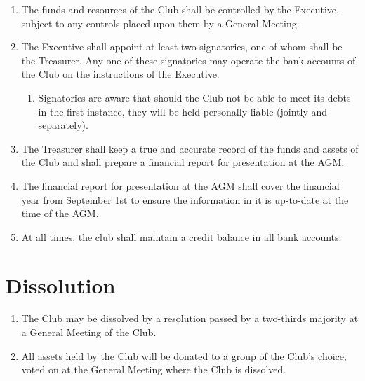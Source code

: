 \documentclass[a4paper]{article}
\begin{document}
	\begin{enumerate}
		\item The funds and resources of the Club shall be controlled by the Executive, subject to any controls placed upon them by a General Meeting.
		
		\item The Executive shall appoint at least two signatories, one of whom shall be the Treasurer.
		Any one of these signatories may operate the bank accounts of the Club on the instructions of the Executive.
		\begin{enumerate}
			\item Signatories are aware that should the Club not be able to meet its debts in the first instance, they will be held personally liable (jointly and separately).
		\end{enumerate}
	
		\item The Treasurer shall keep a true and accurate record of the funds and assets of the Club and shall prepare a financial report for presentation at the \ac{AGM}.
		
		\item The financial report for presentation at the \ac{AGM} shall cover the financial year from September 1st to ensure the information in it is up-to-date at the time of the \ac{AGM}.
		
		\item At all times, the club shall maintain a credit balance in all bank accounts.

	\end{enumerate}

	\section{Dissolution}
	
	\begin{enumerate}
		\item The Club may be dissolved by a resolution passed by a two-thirds majority at a General Meeting of the Club.
		
		\item All assets held by the Club will be donated to a group of the Club's choice, voted on at the General Meeting where the Club is dissolved.
	\end{enumerate}
	
\end{document}
